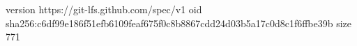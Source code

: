 version https://git-lfs.github.com/spec/v1
oid sha256:c6df99e186f51efb6109feaf675f0c8b8867cdd24d03b5a17c0d8c1f6ffbe39b
size 771
